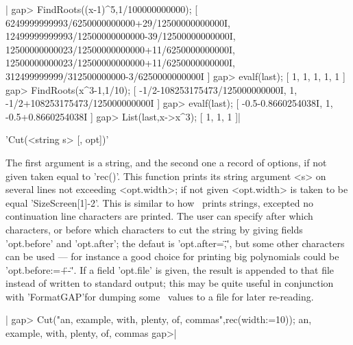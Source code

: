 |    gap> FindRoots((x-1)^5,1/100000000000);
    [ 6249999999993/6250000000000+29/12500000000000I, 
      12499999999993/12500000000000-39/12500000000000I, 
      12500000000023/12500000000000+11/6250000000000I, 
      12500000000023/12500000000000+11/6250000000000I, 
      312499999999/312500000000-3/6250000000000I ]
    gap> evalf(last);
    [ 1, 1, 1, 1, 1 ]
    gap> FindRoots(x^3-1,1/10);            
    [ -1/2-108253175473/125000000000I, 1, -1/2+108253175473/125000000000I ]
    gap> evalf(last);
    [ -0.5-0.8660254038I, 1, -0.5+0.8660254038I ]
    gap> List(last,x->x^3);
    [ 1, 1, 1 ]|


'Cut(<string s> [, opt])'

The  first argument is a string, and the second one a record of options, if
not  given taken equal to 'rec()'. This function prints its string argument
<s> on several lines not exceeding <opt.width>; if not given <opt.width> is
taken  to be equal  'SizeScreen[1]-2'. This is  similar to how \GAP\ prints
strings, excepted no continuation line characters are printed. The user can
specify  after  which  characters,  or  before  which characters to cut the
string  by  giving  fields  'opt.before'  and  'opt.after';  the  defaut is
'opt.after=\",\"', but some other characters can be used --- for instance a
good  choice for printing big polynomials could be 'opt.before:=\"+-\"'. If
a field 'opt.file' is given, the result is appended to that file instead of
written  to standard output;  this may be  quite useful in conjunction with
'FormatGAP'for dumping some \GAP\ values to a file for later re-reading.

|    gap> Cut("an, example, with, plenty, of, commas\n",rec(width:=10));
    an,
    example,
    with,
    plenty,
    of,
    commas
    gap>|

